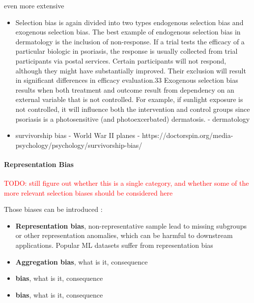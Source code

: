 \documentclass[12pt, a4paper, oneside]{book}   	%
\renewcommand{\todo}[1]{\textcolor{red}{TODO: #1}}
\newif\ifrawcitationactive
\newcommand{\rawcitationend}{\color{black}\rawcitationactivefalse}
\begin{document}
				even more extensive
				\begin{itemize}
					\item Selection bias is again divided into two types endogenous selection bias and exogenous selection bias. The best example of endogenous selection bias in dermatology is the inclusion of non-response. If a trial tests the efficacy of a particular biologic in psoriasis, the response is usually collected from trial participants via postal services. Certain participants will not respond, although they might have substantially improved. Their exclusion will result in significant differences in efficacy evaluation.33
					Exogenous selection bias results when both treatment and outcome result from dependency on an external variable that is not controlled. For example, if sunlight exposure is not controlled, it will influence both the intervention and control groups since psoriasis is a photosensitive (and photoexcerbated) dermatosis. \autocite{Chakraborty_2023} - dermatology
					
					
					\item survivorship bias - World War II planes \autocite{Silfwer_2017} - https://doctorspin.org/media-psychology/psychology/survivorship-bias/
				\end{itemize}
					
				\rawcitationend
					
				\paragraph{Representation Bias \autocite{Mehrabi_2021} \autocite{Chakraborty_2024}}
				\todo{still figure out whether this is a single category, and whether some of the more relevant selection biases should be considered here} 
				
				Those biases can be introduced :
				\begin{itemize}
					\item \textbf{Representation bias}, non-representative sample lead to missing subgroups or other representation anomalies, which can be harmful to downstream applications. Popular ML datasets suffer from representation bias \autocites{Mehrabi_2021}{M142_}
					\item \textbf{Aggregation bias}, what is it, consequence \autocite{}
					\item \textbf{bias}, what is it, consequence \autocite{}
					\item \textbf{bias}, what is it, consequence \autocite{}
				\end{itemize}
				
\end{document}
